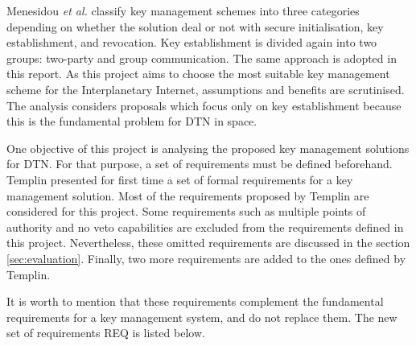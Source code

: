 Menesidou \textit{et al.} \cite{menesidou2017cryptographic} classify key management schemes into three categories depending on whether the solution deal or not with secure initialisation, key establishment, and revocation. Key establishment is divided again into two groups: two-party and group communication. The same approach is adopted in this report. As this project aims to choose the most suitable key management scheme for the Interplanetary Internet, assumptions and benefits are scrutinised. The analysis considers proposals which focus only on key establishment because this is the fundamental problem for DTN in space.

One objective of this project is analysing the proposed key management solutions for DTN. For that purpose, a set of requirements must be defined beforehand. Templin \cite{templin-dtnskmreq-00} presented for first time a set of formal requirements for a key management solution. Most of the requirements proposed by Templin are considered for this project. Some requirements such as multiple points of authority and no veto capabilities are excluded from the requirements defined in this project. Nevertheless, these omitted requirements are discussed in the section \ref{sec:evaluation}. Finally, two more requirements are added to the ones defined by Templin. 

It is worth to mention that these requirements complement the fundamental requirements for a key management system, and do not replace them. The new set of requirements REQ is listed below.
  


